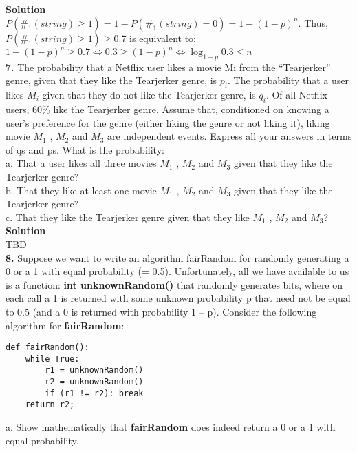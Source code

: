 \documentclass[10pt,a4paper,oneside,draft]{report}
\begin{document}
\textbf{Solution} \\

$P(\#_1(string) \geq 1) = 1 - P(\#_1(string)=0) = 1 - (1 - p)^n$.
Thus, $P(\#_1(string) \geq 1) \geq 0.7$ is equivalent to:
$1 - (1 - p)^n \geq 0.7 \iff 0.3 \geq (1 - p)^n \iff \log_{1-p} 0.3 \leq n $ \\

\textbf{7.} The probability that a Netflix user likes a movie Mi from the “Tearjerker” genre, given that they like the Tearjerker genre, is $p_i$. The probability that a user likes $M_i$ given that they do not like the Tearjerker genre, is $q_i$. Of all Netflix users, 60\% like the Tearjerker genre. Assume that, conditioned on knowing a user’s preference for the genre (either liking the genre or not liking it), liking movie $M_1$ , $M_2$ and $M_3$ are independent events. Express all your answers in terms of qs and ps. What is the probability: \\
a. That a user likes all three movies $M_1$ , $M_2$ and $M_3$ given that they like the Tearjerker genre? \\
b. That they like at least one movie $M_1$ , $M_2$ and $M_3$ given that they like the Tearjerker genre? \\
c. That they like the Tearjerker genre given that they like $M_1$ , $M_2$ and $M_3$? \\

\textbf{Solution} \\

TBD \\

\textbf{8.} Suppose we want to write an algorithm fairRandom for randomly generating a 0 or a 1 with equal probability (= 0.5). Unfortunately, all we have available to us is a function: \textbf{int unknownRandom()} that randomly generates bits, where on each call a 1 is returned with some unknown probability p that need not be equal to 0.5 (and a 0 is returned with probability 1 – p). Consider the following algorithm for \textbf{fairRandom}: \\

\begin{verbatim}
def fairRandom():
    while True:
        r1 = unknownRandom()
        r2 = unknownRandom()
        if (r1 != r2): break
    return r2;
\end{verbatim}

a. Show mathematically that \textbf{fairRandom} does indeed return a 0 or a 1 with equal probability. \\
\end{document}
